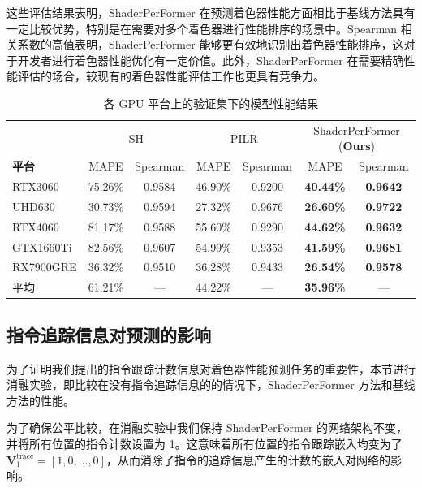 这些评估结果表明，ShaderPerFormer 在预测着色器性能方面相比于基线方法具有一定比较优势，特别是在需要对多个着色器进行性能排序的场景中。Spearman 相关系数的高值表明，ShaderPerFormer 能够更有效地识别出着色器性能排序，这对于开发者进行着色器性能优化有一定价值。此外，ShaderPerFormer 在需要精确性能评估的场合，较现有的着色器性能评估工作也更具有竞争力。

\begin{table}[h]
    \centering
    \caption{各 GPU 平台上的验证集下的模型性能结果}
    \label{table:mainResults}
    \begin{tabular}{l|cccccc}
    \toprule
        ~  & \multicolumn{2}{c}{SH} & \multicolumn{2}{c}{PILR} & \multicolumn{2}{c}{ShaderPerFormer (\textbf{Ours})} \\ 
        \textbf{平台}          & MAPE & Spearman & MAPE & Spearman & MAPE & Spearman \\
    \midrule
        RTX3060 &  75.26\% & 0.9584 &  46.90\% & 0.9200 & \textbf{40.44\%} & \textbf{0.9642} \\
        UHD630 &  30.73\% & 0.9594 &  27.32\% & 0.9676 & \textbf{26.60\%} & \textbf{0.9722} \\
        RTX4060 &  81.17\% & 0.9588 &  55.60\% & 0.9290 & \textbf{44.62\%} & \textbf{0.9632} \\
        GTX1660Ti &  82.56\% & 0.9607 &  54.99\% & 0.9353 & \textbf{41.59\%} & \textbf{0.9681} \\
        RX7900GRE &  36.32\% & 0.9510 &  36.28\% & 0.9433 & \textbf{26.54\%} & \textbf{0.9578} \\
    \midrule
        平均 & 61.21\% & --- & 44.22\% & --- & \textbf{35.96\%} & --- \\
    \bottomrule
    \end{tabular}
\end{table}

\subsection{指令追踪信息对预测的影响}

为了证明我们提出的指令跟踪计数信息对着色器性能预测任务的重要性，本节进行消融实验，即比较在没有指令追踪信息的的情况下，ShaderPerFormer 方法和基线方法的性能。

为了确保公平比较，在消融实验中我们保持 ShaderPerFormer 的网络架构不变，并将所有位置的指令计数设置为 1。这意味着所有位置的指令跟踪嵌入均变为了 $\mathbf{V}^\text{trace}_{1} = [1, 0, \dots, 0]$，从而消除了指令的追踪信息产生的计数的嵌入对网络的影响。


